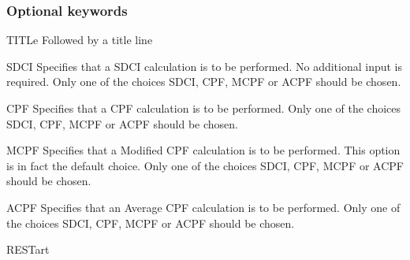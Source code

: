 \subsubsection{Optional keywords}
 
\begin{keywordlist}
\item[TITLe]
Followed by a title line
\item[SDCI]
Specifies that a SDCI calculation is to be performed.
No additional input is required.
Only one of the choices SDCI, CPF, MCPF or ACPF should be chosen.
\item[CPF]
Specifies that a CPF calculation is to be performed.
Only one of the choices SDCI, CPF, MCPF or ACPF should be chosen.
\item[MCPF]
Specifies that a Modified CPF calculation is to be performed.
This option is in fact the default choice.
Only one of the choices SDCI, CPF, MCPF or ACPF should be chosen.
\item[ACPF]
Specifies that an Average CPF calculation is to be performed.
Only one of the choices SDCI, CPF, MCPF or ACPF should be chosen.
\item[RESTart]

\end{keywordlist}
